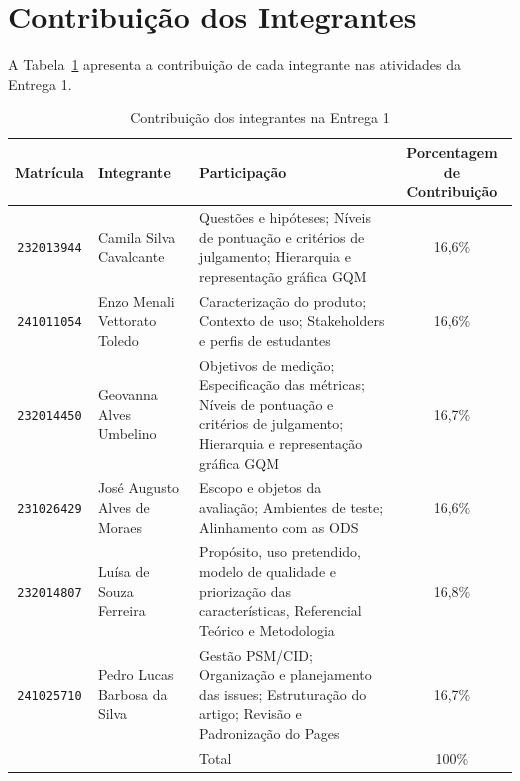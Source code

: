 \documentclass[sigconf, language=english, language=brazilian,natbib=false]{acmart}
\begin{document}
\printbibliography

\appendix

\section{Contribuição dos Integrantes}

A Tabela~\ref{tab:commands} apresenta a contribuição de cada integrante nas atividades da Entrega 1.

\begin{table}[htbp]
  \centering
  \caption{Contribuição dos integrantes na Entrega 1}
  \label{tab:commands}
  \begin{tabular}{c l p{8cm} c}
    \toprule
    Matrícula & Integrante & Participação & Porcentagem de Contribuição \\
    \midrule
    \texttt{232013944} & Camila Silva Cavalcante & Questões e hipóteses; Níveis de pontuação e critérios de julgamento; Hierarquia e representação gráfica GQM & 16,6\% \\
    \texttt{241011054} & Enzo Menali Vettorato Toledo & Caracterização do produto; Contexto de uso; Stakeholders e perfis de estudantes & 16,6\% \\
    \texttt{232014450} & Geovanna Alves Umbelino & Objetivos de medição; Especificação das métricas; Níveis de pontuação e critérios de julgamento; Hierarquia e representação gráfica GQM & 16,7\% \\
    \texttt{231026429} & José Augusto Alves de Moraes & Escopo e objetos da avaliação; Ambientes de teste; Alinhamento com as ODS & 16,6\% \\
    \texttt{232014807} & Luísa de Souza Ferreira & Propósito, uso pretendido, modelo de qualidade e priorização das características, Referencial Teórico e Metodologia & 16,8\% \\
    \texttt{241025710} & Pedro Lucas Barbosa da Silva & Gestão PSM/CID; Organização e planejamento das issues; Estruturação do artigo; Revisão e Padronização do Pages & 16,7\% \\
    \midrule
    & & Total & 100\% \\
    \bottomrule
  \end{tabular}
\end{table}
\end{document}
